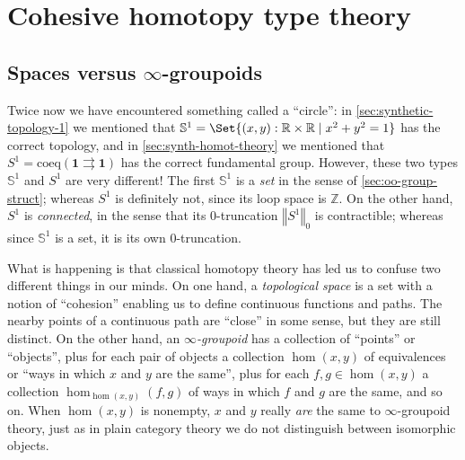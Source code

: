 \documentclass[10pt]{article}
\let\setof\Set
\def\oo{\ensuremath{\infty}}
\def\Z{\mathbb{Z}}
\def\R{\mathbb{R}}
\def\hocirc{S^1}
\def\topcirc{\mathbb{S}^1}
\def\unit{\mathbf{1}}
\numberwithin{equation}{section}
\newcommand{\trunc}[2]{\mathopen{}\left\Vert #2\right\Vert_{#1}\mathclose{}}
\begin{document}
\section{Cohesive homotopy type theory}
\label{sec:cohes-homot-type}

\subsection{Spaces versus \oo-groupoids}
\label{sec:spaces-oo-groupoids}

Twice now we have encountered something called a ``circle'': in \cref{sec:synthetic-topology-1} we mentioned that $\topcirc = \setof{ (x,y):\R\times\R \mid x^2+y^2=1 }$ has the correct topology, and in \cref{sec:synth-homot-theory} we mentioned that $\hocirc = \mathrm{coeq}(\unit \rightrightarrows \unit)$ has the correct fundamental group.
However, these two types $\topcirc$ and $\hocirc$ are very different!
The first $\topcirc$ is a \emph{set} in the sense of \cref{sec:oo-group-struct}; %
whereas $\hocirc$ is definitely not, since its loop space is $\Z$.
On the other hand, $\hocirc$ is \emph{connected}, in the sense that its 0-truncation $\trunc 0 \hocirc$ is contractible; whereas since $\topcirc$ is a set, it is its own 0-truncation.

What is happening is that classical homotopy theory has led us to confuse two different things in our minds.
On one hand, a \emph{topological space} is a set with a notion of ``cohesion'' enabling us to define continuous functions and paths.
The nearby points of a continuous path are ``close'' in some sense, but they are still distinct.
On the other hand, an \emph{\oo-groupoid} has a collection of ``points'' or ``objects'', plus for each pair of objects a collection $\hom(x,y)$ of equivalences or ``ways in which $x$ and $y$ are the same'', plus for each $f,g\in \hom(x,y)$ a collection $\hom_{\hom(x,y)}(f,g)$ of ways in which $f$ and $g$ are the same, and so on.
When $\hom(x,y)$ is nonempty, $x$ and $y$ really \emph{are} the same to \oo-groupoid theory, just as in plain category theory we do not distinguish between isomorphic objects.
\end{document}
